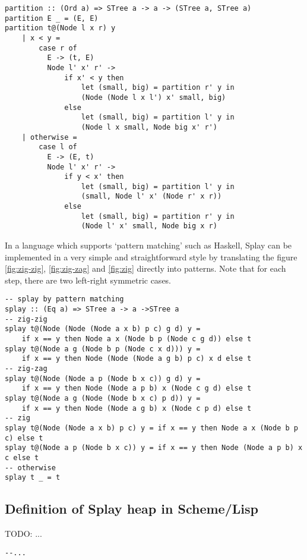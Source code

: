 \documentclass{article}
\begin{document}
\begin{lstlisting}
partition :: (Ord a) => STree a -> a -> (STree a, STree a)
partition E _ = (E, E)
partition t@(Node l x r) y 
    | x < y = 
        case r of
          E -> (t, E)
          Node l' x' r' -> 
              if x' < y then 
                  let (small, big) = partition r' y in
                  (Node (Node l x l') x' small, big)
              else 
                  let (small, big) = partition l' y in
                  (Node l x small, Node big x' r')
    | otherwise = 
        case l of
          E -> (E, t)
          Node l' x' r' ->
              if y < x' then
                  let (small, big) = partition l' y in
                  (small, Node l' x' (Node r' x r))
              else
                  let (small, big) = partition r' y in
                  (Node l' x' small, Node big x r)
\end{lstlisting}

In a language which supports `pattern matching' such as Haskell,
Splay can be implemented in a very simple and straightforward style
by translating the figure \ref{fig:zig-zig}, \ref{fig:zig-zag} and
\ref{fig:zig} directly into patterns. Note that for each step,
there are two left-right symmetric cases.

\lstset{language=Haskell}
\begin{lstlisting}
-- splay by pattern matching
splay :: (Eq a) => STree a -> a ->STree a
-- zig-zig
splay t@(Node (Node (Node a x b) p c) g d) y =
    if x == y then Node a x (Node b p (Node c g d)) else t
splay t@(Node a g (Node b p (Node c x d))) y =
    if x == y then Node (Node (Node a g b) p c) x d else t
-- zig-zag
splay t@(Node (Node a p (Node b x c)) g d) y =
    if x == y then Node (Node a p b) x (Node c g d) else t
splay t@(Node a g (Node (Node b x c) p d)) y =
    if x == y then Node (Node a g b) x (Node c p d) else t
-- zig
splay t@(Node (Node a x b) p c) y = if x == y then Node a x (Node b p c) else t
splay t@(Node a p (Node b x c)) y = if x == y then Node (Node a p b) x c else t
-- otherwise
splay t _ = t
\end{lstlisting}

\subsection*{Definition of Splay heap in Scheme/Lisp}

TODO: ...

\lstset{language=lisp}
\begin{lstlisting}
--...
\end{lstlisting}
\end{document}
